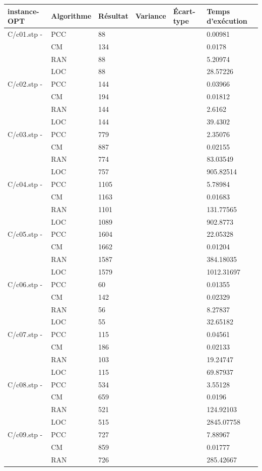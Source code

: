 \documentclass[12pt,a4paper]{article}
\begin{document}
\begin{center}
	\begin{tabular}{l|l|l|l|l|l}
		instance-OPT & Algorithme & Résultat & Variance & Écart-type & Temps d'exécution\\ \hline \hline
		C/c01.stp - &PCC&88&&&0.00981\\
		&CM&134&&&0.0178\\
		&RAN&88&&&5.20974\\
		&LOC&88&&&28.57226\\\hline
		C/c02.stp - &PCC&144&&&0.03966\\
		&CM&194&&&0.01812\\
		&RAN&144&&&2.6162\\
		&LOC&144&&&39.4302\\\hline
		C/c03.stp - &PCC&779&&&2.35076\\
		&CM&887&&&0.02155\\
		&RAN&774&&&83.03549\\
		&LOC&757&&&905.82514\\\hline
		C/c04.stp - &PCC&1105&&&5.78984\\
		&CM&1163&&&0.01683\\
		&RAN&1101&&&131.77565\\
		&LOC&1089&&&902.8773\\\hline
		C/c05.stp - &PCC&1604&&&22.05328\\
		&CM&1662&&&0.01204\\
		&RAN&1587&&&384.18035\\
		&LOC&1579&&&1012.31697\\\hline
		C/c06.stp - &PCC&60&&&0.01355\\
		&CM&142&&&0.02329\\
		&RAN&56&&&8.27837\\
		&LOC&55&&&32.65182\\\hline
		C/c07.stp - &PCC&115&&&0.04561\\
		&CM&186&&&0.02133\\
		&RAN&103&&&19.24747\\
		&LOC&115&&&69.87937\\\hline
		C/c08.stp - &PCC&534&&&3.55128\\
		&CM&659&&&0.0196\\
		&RAN&521&&&124.92103\\
		&LOC&515&&&2845.07758\\\hline
		C/c09.stp - &PCC&727&&&7.88967\\
		&CM&859&&&0.01777\\
		&RAN&726&&&285.42667\\

\end{tabular}
\end{center}
\end{document}
